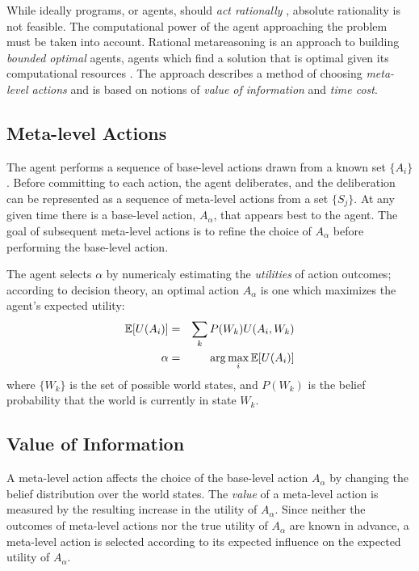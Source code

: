 While ideally programs, or agents, should {\em act rationally}
\cite{Russell.aima}, absolute rationality is not feasible. The
computational power of the agent approaching the problem must be taken
into account. Rational metareasoning \cite{Russell.right} is an
approach to building {\em bounded optimal} agents, agents which find a
solution that is optimal given its computational resources
\cite{Horvitz.reasoningabout}. The approach describes a method of
choosing {\em meta-level actions} and is based on notions of {\em
value of information} and {\em time cost}.

\subsection{Meta-level Actions}

The agent performs a sequence of base-level actions drawn from a known
set $\{A_i\}$. Before committing to each action, the agent
deliberates, and the deliberation can be represented as a sequence of
meta-level actions from a set $\{S_j\}$. At any given time there is a
base-level action, $A_\alpha$, that appears best to the agent. The
goal of subsequent meta-level actions is to refine the choice of
$A_\alpha$ before performing the base-level action.

The agent selects $\alpha$ by numericaly estimating the {\em
  utilities} of action outcomes; according to decision theory, an
optimal action $A_\alpha$ is one which maximizes the agent's expected
utility:
\begin{eqnarray}
\label{eq:bg-limited-eu}
\mathbb{E}[U(A_i)]&=&\sum_k P(W_k) U(A_i,W_k)\\
\alpha&=&\arg \max_i \mathbb{E}[U(A_i)]
\end{eqnarray}
where $\{W_k\}$ is the set of possible world states, and $P(W_k)$ is
the belief probability that the world is currently in state $W_k$.

\subsection{Value of Information}
\label{sec:ratimeta-voi}

A meta-level action affects the choice of the base-level action
$A_\alpha$ by changing the belief distribution over the world
states. The {\em value} of a meta-level action is measured by the
resulting increase in the utility of $A_\alpha$. Since neither the
outcomes of meta-level actions nor the true utility of $A_\alpha$ are
known in advance, a meta-level action is selected according to its
expected influence on the expected utility of $A_\alpha$.


